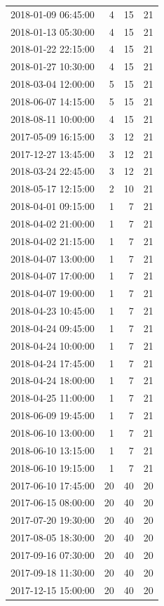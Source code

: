 \begin{tabular}{lrrr}
2018-01-09 06:45:00 & 4 & 15 & 21 \\
2018-01-13 05:30:00 & 4 & 15 & 21 \\
2018-01-22 22:15:00 & 4 & 15 & 21 \\
2018-01-27 10:30:00 & 4 & 15 & 21 \\
2018-03-04 12:00:00 & 5 & 15 & 21 \\
2018-06-07 14:15:00 & 5 & 15 & 21 \\
2018-08-11 10:00:00 & 4 & 15 & 21 \\
2017-05-09 16:15:00 & 3 & 12 & 21 \\
2017-12-27 13:45:00 & 3 & 12 & 21 \\
2018-03-24 22:45:00 & 3 & 12 & 21 \\
2018-05-17 12:15:00 & 2 & 10 & 21 \\
2018-04-01 09:15:00 & 1 & 7 & 21 \\
2018-04-02 21:00:00 & 1 & 7 & 21 \\
2018-04-02 21:15:00 & 1 & 7 & 21 \\
2018-04-07 13:00:00 & 1 & 7 & 21 \\
2018-04-07 17:00:00 & 1 & 7 & 21 \\
2018-04-07 19:00:00 & 1 & 7 & 21 \\
2018-04-23 10:45:00 & 1 & 7 & 21 \\
2018-04-24 09:45:00 & 1 & 7 & 21 \\
2018-04-24 10:00:00 & 1 & 7 & 21 \\
2018-04-24 17:45:00 & 1 & 7 & 21 \\
2018-04-24 18:00:00 & 1 & 7 & 21 \\
2018-04-25 11:00:00 & 1 & 7 & 21 \\
2018-06-09 19:45:00 & 1 & 7 & 21 \\
2018-06-10 13:00:00 & 1 & 7 & 21 \\
2018-06-10 13:15:00 & 1 & 7 & 21 \\
2018-06-10 19:15:00 & 1 & 7 & 21 \\
2017-06-10 17:45:00 & 20 & 40 & 20 \\
2017-06-15 08:00:00 & 20 & 40 & 20 \\
2017-07-20 19:30:00 & 20 & 40 & 20 \\
2017-08-05 18:30:00 & 20 & 40 & 20 \\
2017-09-16 07:30:00 & 20 & 40 & 20 \\
2017-09-18 11:30:00 & 20 & 40 & 20 \\
2017-12-15 15:00:00 & 20 & 40 & 20 \\

\end{tabular}
